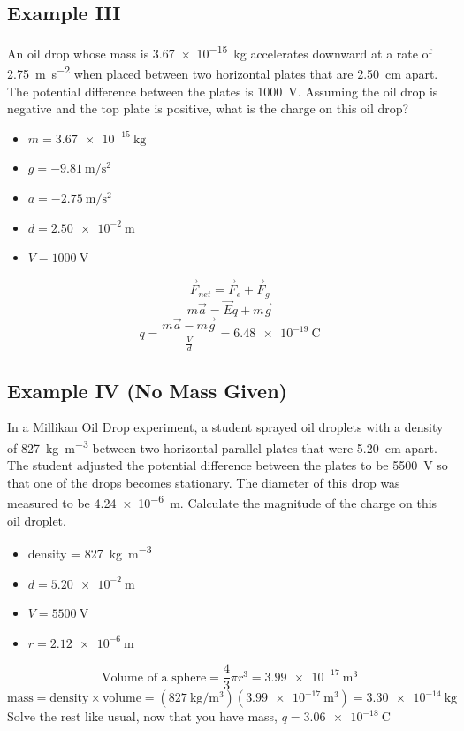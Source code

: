 \documentclass[a4paper,12pt]{article}
\begin{document}
\subsection{Example III}
An oil drop whose mass is \SI{3.67e-15}{\kg} accelerates downward at a rate of \SI{2.75}{\m\per\s\squared} when placed between two horizontal plates that are \SI{2.50}{\centi\m} apart. The potential difference between the plates is \SI{1000}{\volt}. Assuming the oil drop is negative and the top plate is positive, what is the charge on this oil drop?
\begin{itemize}
    \item{$m = \SI{3.67e-15}{\kg}$}
    \item{$g = \SI{-9.81}{\m\per\s\squared}$}
    \item{$a = \SI{-2.75}{\m\per\s\squared}$}
    \item{$d = \SI{2.50e-2}{\m}$}
    \item{$V = \SI{1000}{\volt}$}
\end{itemize}
$$\vec{F}_{net} = \vec{F}_e + \vec{F}_g$$
$$m\vec{a} = \vec{E}q + m\vec{g}$$
$$q = \frac{m\vec{a} - m\vec{g}}{\frac{V}{d}} = \SI{6.48e-19}{\coulomb}$$

\subsection{Example IV (No Mass Given)}
In a Millikan Oil Drop experiment, a student sprayed oil droplets with a density of \SI{827}{\kg\per\m\cubed} between two horizontal parallel plates that were \SI{5.20}{\centi\m} apart. The student adjusted the potential difference between the plates to be \SI{5500}{\volt} so that one of the drops becomes stationary. The diameter of this drop was measured to be \SI{4.24e-6}{\m}. Calculate the magnitude of the charge on this oil droplet.
\begin{itemize}
    \item{density = \SI{827}{\kg\per\m\cubed}}
    \item{$d = \SI{5.20e-2}{\m}$}
    \item{$V = \SI{5500}{\volt}$}
    \item{$r = \SI{2.12e-6}{\m}$}
\end{itemize}

$$\textrm{Volume of a sphere} = \frac{4}{3}\pi r^3 = \SI{3.99e-17}{\m\cubed}$$
$$\textrm{mass} = \textrm{density} \times \textrm{volume} = (\SI{827}{\kg\per\m\cubed})(\SI{3.99e-17}{\m\cubed}) = \SI{3.30e-14}{\kg}$$
Solve the rest like usual, now that you have mass, $q = \SI{3.06e-18}{\coulomb}$
\end{document}
